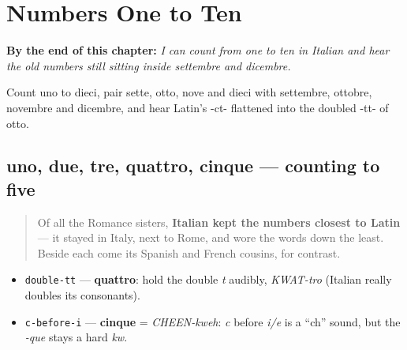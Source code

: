 
\chapter{Numbers One to Ten}
\label{ch:it-numbers-one-to-ten}

\begin{chapteropening}
\textbf{By the end of this chapter:} \emph{I can count from one to ten in Italian and hear the old numbers still sitting inside settembre and dicembre.}

Count uno to dieci, pair sette, otto, nove and dieci with settembre, ottobre, novembre and dicembre, and hear Latin's -ct- flattened into the doubled -tt- of otto.
\end{chapteropening}

\section[uno, due, tre, quattro, cinque]{uno, due, tre, quattro, cinque — counting to five}

\label{lesson:IT-C06-numeri-1-5}



\begin{quote}
Of all the Romance sisters, \textbf{Italian kept the numbers closest to Latin} — it stayed in Italy, next to Rome, and wore the words down the least. Beside each come its Spanish and French cousins, for contrast.
\end{quote}

\begin{sounds}
\begin{itemize}
\raggedright
  \item \texttt{double-tt} — \textbf{quattro}: hold the double \emph{t} audibly, \emph{KWAT-tro} (Italian really doubles its consonants).
  \item \texttt{c-before-i} — \textbf{cinque} = \emph{CHEEN-kweh}: \emph{c} before \emph{i/e} is a \textquotedblleft{}ch\textquotedblright{} sound, but the \emph{-que} stays a hard \emph{kw}.
\end{itemize}
\end{sounds}

